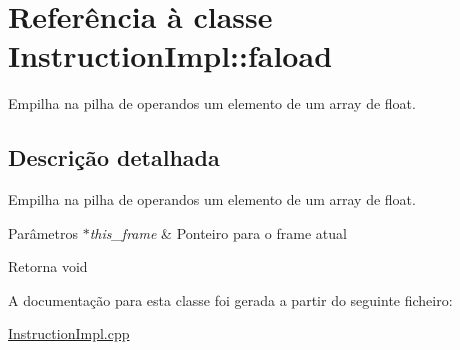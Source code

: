 \hypertarget{class_instruction_impl_1_1faload}{}\section{Referência à classe Instruction\+Impl\+:\+:faload}
\label{class_instruction_impl_1_1faload}


Empilha na pilha de operandos um elemento de um array de float.  




\subsection{Descrição detalhada}
Empilha na pilha de operandos um elemento de um array de float. 


\begin{DoxyParams}{Parâmetros}
{\em $\ast$this\+\_\+frame} & Ponteiro para o frame atual \\
\hline
\end{DoxyParams}
\begin{DoxyReturn}{Retorna}
void 
\end{DoxyReturn}


A documentação para esta classe foi gerada a partir do seguinte ficheiro\+:\begin{DoxyCompactItemize}
\item 
\hyperlink{_instruction_impl_8cpp}{Instruction\+Impl.\+cpp}\end{DoxyCompactItemize}
